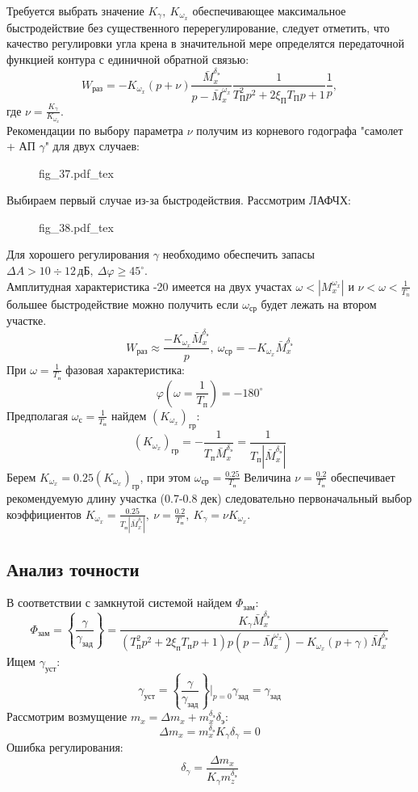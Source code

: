 \documentclass{article}
\begin{document}
Требуется выбрать значение $K_\gamma, \ K_{\omega_x}$ обеспечивающее максимальное быстродействие без существенного перерегулирование, следует отметить, что качество регулировки угла крена в значительной мере определятся передаточной функцией контура с единичной обратной связью: 
\[
	W_\text{раз} = -K_{\omega_x} (p + \nu)\frac{\bar{M}_x^{\delta_\text{э}}}{p -\bar{M}_x^{\omega_x}}\frac{1}{T_\text{П}^2 p^2 + 2 \xi_\text{П} T_\text{П} p + 1}\frac{1}{p},
\]
где $\nu = \frac{K_\gamma}{K_{\omega_x}}$.\\
Рекомендации по выбору параметра $\nu$ получим из корневого годографа "самолет + АП $\gamma$" для двух случаев:

\begin{figure}[H]
	\centering
	{fig_37.pdf_tex}
\end{figure}
Выбираем первый случае из-за быстродействия. 
Рассмотрим ЛАФЧХ:
\begin{figure}[H]
	\centering
	{fig_38.pdf_tex}
\end{figure}

Для хорошего регулирования $\gamma$ необходимо обеспечить запасы $\Delta A > 10 \div 12 \, \text{дБ},\ \Delta \varphi \geq 45^\circ$.\\
Амплитудная характеристика -20 имеется на двух участах $\omega < |M_x^{\omega_x}|$ и $\nu < \omega <\frac{1}{T_n}$ большее быстродействие можно получить если $\omega_\text{ср}$ будет лежать на втором участке.
\[
	W_\text{раз} \approx \frac{-K_{\omega_x} \bar{M}_x^{\delta_\text{э}}}{p},\ \omega_\text{ср} = -K_{\omega_x} \bar{M}_x^{\delta_\text{э}}
\]
При $\omega = \frac{1}{T_\text{п}}$ фазовая характеристика:
\[
	\varphi(\omega=\frac{1}{T_\text{п}}) = -180^\circ
\]
Предполагая $\omega_\text{с} = \frac{1}{T_\text{п}}$ найдем $(K_{\omega_x})_\text{гр}$:
\[
	(K_{\omega_x})_\text{гр} = -\frac{1}{T_\text{п} \bar{M}_x^{\delta_\text{э}}} = \frac{1}{T_\text{п} |\bar{M}_x^{\delta_\text{э}}|}
\]
Берем $K_{\omega_x} = 0.25(K_{\omega_x})_\text{гр}$, при этом $\omega_\text{ср} = \frac{0.25}{T_\text{п}}$
Величина $\nu =\frac{0.2}{T_\text{п}}$ обеспечивает рекомендуемую длину участка (0.7-0.8 дек) следовательно первоначальный выбор коэффициентов $K_{\omega_x} =\frac{0.25}{T_\text{п} |\bar{M}_x^{\delta_\text{э}}|}, \ \nu= \frac{0.2}{T_\text{п}},\ K_\gamma = \nu K_{\omega_x}$.

\subsection{Анализ точности}
В соответствии с замкнутой системой найдем $\Phi_\text{зам}$:
\[
	\Phi_\text{зам} =\left\{\frac{\gamma}{\gamma_\text{зад}}\right\} = \frac{K_\gamma \bar{M}_x^{\delta_\text{э}}}{(T_\text{п}^2 p^2 + 2 \xi_\text{п} T_\text{п} p + 1)p(p - \bar{M}_x^{\omega_x}) - K_{\omega_x}(p + \gamma)\bar{M}_x^{\delta_\text{э}}} 
\]
Ищем $\gamma_\text{уст}$:
\[ \gamma_\text{уст} = \left\{\frac{\gamma}{\gamma_\text{зад}}\right\}\Big|_{p = 0} \gamma_\text{зад} = \gamma_\text{зад} \]
Рассмотрим возмущение $m_x = \Delta m_x + m_x^{\delta_\text{э}} \delta_\text{э}$:
\[
	\Delta m_x = m_x^{\delta_\text{э}} K_\gamma \delta_\gamma = 0
\]
Ошибка регулирования:
\[
	\delta_\gamma =\frac{\Delta m_x}{K_\gamma m_z^{\delta_\text{э}}} 
\]
\end{document}
